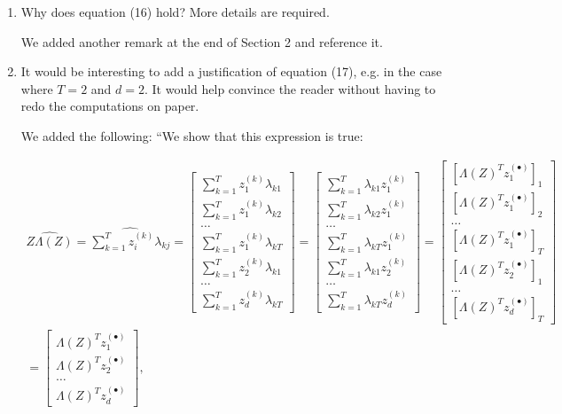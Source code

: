 \documentclass{article}
\begin{document}
\begin{enumerate}
\begin{enumerate}[label=\arabic*.]
\item Why does equation (16) hold? More details are required.

    {\color{mred} We added another remark at the end of Section 2 and reference it.}
\item It would be interesting to add a justification of equation (17), e.g. in the case where $T = 2$ and $d = 2$. It would help convince the reader without having to redo the computations on paper.

    {\color{mred} We added the following: ``We show that this expression is true:

    \begin{multline*}
        \widehat{Z\Lambda(Z)} = \widehat{\sum_{k=1}^Tz_i^{(k)}\lambda_{kj}} = \begin{bmatrix} \sum_{k=1}^T z_1^{(k)}\lambda_{k1} \\ \sum_{k=1}^T z_1^{(k)}\lambda_{k2} \\ \ldots \\ \sum_{k=1}^T z_1^{(k)}\lambda_{kT} \\ \sum_{k=1}^T z_2^{(k)}\lambda_{k1} \\ \ldots \\ \sum_{k=1}^T z_d^{(k)}\lambda_{kT} \end{bmatrix} = \begin{bmatrix} \sum_{k=1}^T \lambda_{k1}z_1^{(k)} \\ \sum_{k=1}^T \lambda_{k2}z_1^{(k)} \\ \ldots \\ \sum_{k=1}^T \lambda_{kT}z_1^{(k)} \\ \sum_{k=1}^T \lambda_{k1}z_2^{(k)} \\ \ldots \\ \sum_{k=1}^T \lambda_{kT}z_d^{(k)} \end{bmatrix} = \begin{bmatrix} [\Lambda(Z)^T z_1^{(\bullet)}]_1 \\ [\Lambda(Z)^T z_1^{(\bullet)}]_2 \\ \ldots \\ [\Lambda(Z)^T z_1^{(\bullet)}]_T \\ [\Lambda(Z)^T z_2^{(\bullet)}]_1 \\ \ldots \\ [\Lambda(Z)^T z_d^{(\bullet)}]_T \end{bmatrix} \\ = \begin{bmatrix} \Lambda(Z)^Tz_1^{(\bullet)} \\ \Lambda(Z)^Tz_2^{(\bullet)} \\ \ldots \\ \Lambda(Z)^Tz_d^{(\bullet)} \end{bmatrix},    \end{multline*}
    
}
\end{enumerate}
\end{enumerate}
\end{document}
